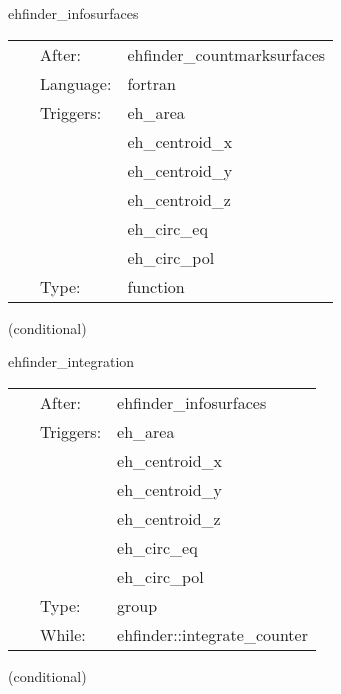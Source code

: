 \hspace{5mm} ehfinder\_infosurfaces 

\hspace{5mm}{\it output info about found surfaces } 


\hspace{5mm}

 \begin{tabular*}{160mm}{cll} 
~ & After:  & ehfinder\_countmarksurfaces \\ 
~ & Language:  & fortran \\ 
~ & Triggers:  & eh\_area \\ 
~& ~ &eh\_centroid\_x\\ 
~& ~ &eh\_centroid\_y\\ 
~& ~ &eh\_centroid\_z\\ 
~& ~ &eh\_circ\_eq\\ 
~& ~ &eh\_circ\_pol\\ 
~ & Type:  & function \\ 
\end{tabular*} 


\vspace{5mm}

   (conditional) 

\hspace{5mm} ehfinder\_integration 

\hspace{5mm}{\it find and integrate over surfaces } 


\hspace{5mm}

 \begin{tabular*}{160mm}{cll} 
~ & After:  & ehfinder\_infosurfaces \\ 
~ & Triggers:  & eh\_area \\ 
~& ~ &eh\_centroid\_x\\ 
~& ~ &eh\_centroid\_y\\ 
~& ~ &eh\_centroid\_z\\ 
~& ~ &eh\_circ\_eq\\ 
~& ~ &eh\_circ\_pol\\ 
~ & Type:  & group \\ 
~ & While:  & ehfinder::integrate\_counter \\ 
\end{tabular*} 


\vspace{5mm}

   (conditional) 

